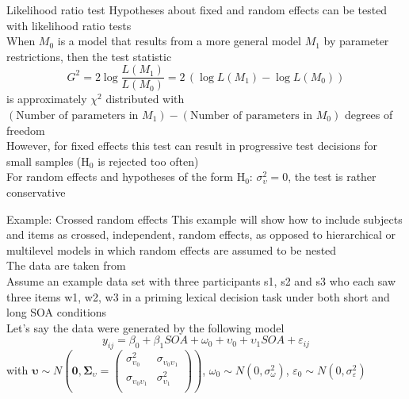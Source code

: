 \documentclass{beamer}
\newcommand{\gvect}[1]{\boldsymbol{#1}}
\newcommand{\gmat}[1]{\boldsymbol{#1}}
\begin{document}
\begin{frame}{Likelihood ratio test}
  Hypotheses about fixed and random effects can be tested with likelihood
  ratio tests\\[2ex]

  When $M_0$ is a model that results from a more general model $M_1$ by
  parameter restrictions, then the test statistic
\[
  G^2 = 2\log \frac{L(M_1)}{L(M_0)}
      = 2\,(\log L(M_1) - \log L(M_0))
\]
  is approximately $\chi^2$ distributed with $(\text{Number of parameters
  in } M_1) - (\text{Number of parameters in } M_0)$ degrees of
  freedom\\[2ex]

  However, for fixed effects this test can result in progressive test
  decisions for small samples (H$_0$ is rejected too often)\\[2ex]
  
  For random effects and hypotheses of the form H$_0$: $\sigma^2_\upsilon =
  0$, the test is rather conservative
  \nocite{BrykRaudenbush2002}
\end{frame}


\begin{frame}{Example: Crossed random effects}
  This example will show how to include subjects and items as crossed,
  independent, random effects, as opposed to hierarchical or multilevel
  models in which random effects are assumed to be nested\\[2ex]

  The data are taken from \citet{Baayen2008}\\[2ex]

  Assume an example data set with three participants s1, s2 and s3 who each saw
  three items w1, w2, w3 in a priming lexical decision task under both short
  and long SOA conditions\\[2ex]

  Let's say the data were generated by the following model
  \[
    y_{ij} = \beta_0 + \beta_1 SOA + \omega_0 + \upsilon_0 + \upsilon_1 SOA
    + \varepsilon_{ij} 
  \]
\small
with $\gvect{\upsilon} \sim N\left(\gvect{0}, \gmat{\Sigma}_{\upsilon} = 
    \begin{pmatrix}
      \sigma^2_{\upsilon_0} & \sigma_{\upsilon_0\upsilon_1} \\
      \sigma_{\upsilon_0\upsilon_1} & \sigma^2_{\upsilon_1} \\
    \end{pmatrix}\right)$,
  $\omega_0 \sim N(0, \sigma_{\omega}^2)$, $\varepsilon_0 \sim N(0,
  \sigma_{\varepsilon}^2)$ 

\end{frame}
\end{document}
